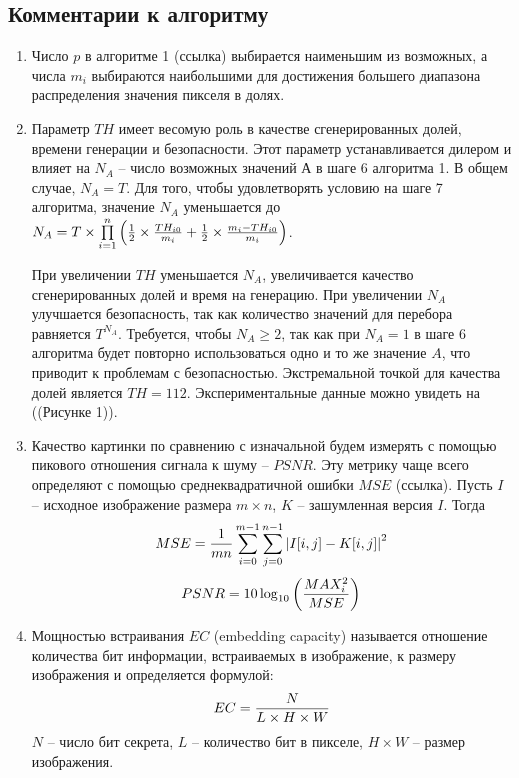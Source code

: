 \documentclass[a4paper,article,14pt]{extarticle}
\begin{document}
\subsection{Комментарии к алгоритму}
\begin{enumerate}
    \item Число $p$ в алгоритме 1 (ссылка) выбирается наименьшим из возможных, а числа $m_i$ выбираются наибольшими для достижения 
    большего диапазона распределения значения пикселя в долях.

    \item Параметр $TH$ имеет весомую роль в качестве сгенерированных долей, времени генерации и безопасности. Этот параметр устанавливается 
    дилером и влияет на $N_A$ -- число возможных значений А в шаге 6 алгоритма 1.
    В общем случае, $N_A = T$. Для того, чтобы удовлетворять условию на шаге 7 алгоритма, значение $N_A$ уменьшается до 
    $N_A = T \times \prod\limits_{i = 1}^n \left({1\over 2} \times {TH_{i0}\over m_i} + {1\over 2} \times {{m_i - TH_{i0}}\over m_i}\right)$.
    
    При увеличении $TH$ уменьшается $N_A$, увеличивается качество сгенерированных долей и время на генерацию.
    При увеличении $N_A$ улучшается безопасность, так как количество значений для перебора равняется $T^{N_A}$. 
    Требуется, чтобы $N_A \geq 2$, так как при $N_A = 1$ в шаге 6 алгоритма будет 
    повторно использоваться одно и то же значение $A$, что приводит к проблемам с безопасностью. Экстремальной точкой для качества долей 
    является $TH = 112$. Экспериментальные данные можно увидеть на ((Рисунке 1)). 

    \item Качество картинки по сравнению с изначальной будем измерять с помощью пикового отношения сигнала к шуму -- $PSNR$. Эту метрику чаще всего 
    определяют с помощью среднеквадратичной ошибки $MSE$ (ссылка). Пусть $I$ -- исходное изображение размера $m \times n$, $K$ -- зашумленная версия $I$. Тогда 
    \begin{equation}
        MSE = {1\over mn} \sum_{i=0}^{m-1} \sum_{j=0}^{n-1}{|I[i, j] - K[i, j]|}^2
    \end{equation}
    \begin{equation}
        PSNR = 10 \log_{10}\left({{MAX_i^2} \over {MSE}} \right)
        \label{eq:RSNR}
    \end{equation}

    \item Мощностью встраивания $EC$ (embedding capacity) называется отношение количества бит информации, встраиваемых в изображение, к размеру изображения 
    и определяется формулой:
    $$EC = {N\over{L\times H \times W}}$$
    $N$ -- число бит секрета, $L$ -- количество бит в пикселе, $H \times W$ -- размер изображения.
    

\end{enumerate}
\end{document}
